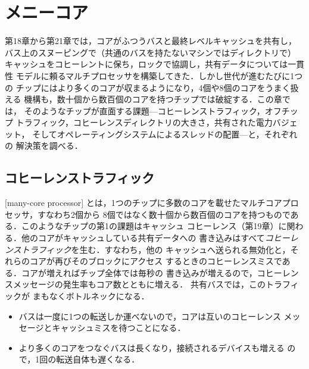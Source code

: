 \documentclass[../main.tex]{subfiles}
\begin{document}
\chapter{メニーコア}

第18章から第21章では，コアがふつうバスと最終レベルキャッシュを共有し，
バス上のスヌーピングで（共通のバスを持たないマシンではディレクトリで）
キャッシュをコヒーレントに保ち，ロックで協調し，共有データについては一貫性
モデルに頼るマルチプロセッサを構築してきた．しかし世代が進むたびに1つの
チップにはより多くのコアが収まるようになり，4個や8個のコアをうまく扱える
機構も，数十個から数百個のコアを持つチップでは破綻する．この章では，
そのようなチップが直面する課題---コヒーレンストラフィック，オフチップ
トラフィック，コヒーレンスディレクトリの大きさ，共有された電力バジェット，
そしてオペレーティングシステムによるスレッドの配置---と，それぞれの
解決策を調べる．

\section{コヒーレンストラフィック}
\label{sec:l22-coherence}

[many-core processor]%
とは，1つのチップに多数のコアを載せたマルチコアプロセッサ，すなわち2個から
8個ではなく数十個から数百個のコアを持つものである．このようなチップの第1の課題はキャッシュ
コヒーレンス（第19章）に関わる．他のコアがキャッシュしている共有データへの
書き込みはすべて\emph{コヒーレンストラフィック}を生む．すなわち，他の
キャッシュへ送られる無効化と，それらのコアが再びそのブロックにアクセス
するときのコヒーレンスミスである．コアが増えればチップ全体では毎秒の
書き込みが増えるので，コヒーレンスメッセージの発生率もコア数とともに増える．%
共有バスでは，このトラフィックが
まもなくボトルネックになる．
\begin{itemize}
  \item バスは一度に1つの転送しか運べないので，コアは互いのコヒーレンス
    メッセージとキャッシュミスを待つことになる．
  \item より多くのコアをつなぐバスは長くなり，接続されるデバイスも増える
    ので，1回の転送自体も遅くなる．
\end{itemize}
\end{document}
